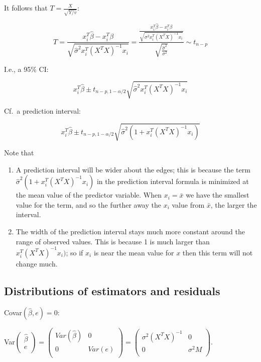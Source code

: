 It follows that  $T=\frac{X}{\sqrt{Y/v}}$:

\begin{equation}
T=  \frac{x_i^T \hat{\beta} - x_i^T \beta}{\sqrt{\hat{\sigma}^2 x_i^T (X^T X)^{-1}x_i}} = 
\frac{  \frac{x_i^T \hat{\beta} - x_i^T \beta}{\sqrt{\sigma^2 x_i^T (X^T X)^{-1}x_i}}}{\sqrt{\frac{\hat{\sigma}^2}{\sigma^2}}}
 \sim t_{n-p}
\end{equation}

I.e., a 95\% CI:

\begin{equation}
x_i^T \hat{\beta} \pm t_{n-p,1-\alpha/2}\sqrt{\hat{\sigma}^2 x_i^T(X^T X)^{-1}x_i}
\end{equation}

Cf.\ a prediction interval:

\begin{equation}
x_i^T \hat{\beta} \pm t_{n-p,1-\alpha/2}\sqrt{\hat{\sigma}^2 (1+x_i^T(X^T X)^{-1}x_i)}
\end{equation}

Note that 

\begin{enumerate}
\item
A prediction interval will be wider about the edges; this is because the term $\hat{\sigma}^2 (1+x_i^T(X^T X)^{-1}x_i)$ in the prediction interval formula is minimized at the mean value of the 
predictor variable. When $x_i = \bar{x}$ we have the smallest value for the term, and so the further away the $x_i$ value from $\bar{x}$, the larger the interval. 
\item 
The width of the prediction interval stays much more constant around the range of observed values.
This is because 1 is much larger than $x_i^T(X^T X)^{-1}x_i)$; so if $x_i$ is near the mean value for $x$ then this term will not change much. 

\end{enumerate}

\subsection{Distributions of estimators and residuals}

Covar$(\hat{\beta},e)=0$: 

         Var$\begin{pmatrix}
	 \hat{\beta} \\
	e \\
	\end{pmatrix}
	= 
	\begin{pmatrix}
	 Var(\hat{\beta}) & 0 \\
	 0 & Var(e) \\
	\end{pmatrix}
	= 
	\begin{pmatrix}
	 \sigma^2 (X^T X)^{-1} & 0 \\
	 0 & \sigma^2 M \\
	\end{pmatrix}
	$.
	
